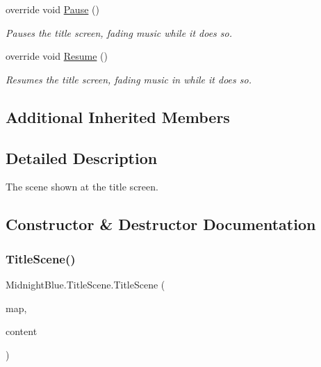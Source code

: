 \begin{DoxyCompactItemize}
override void \hyperlink{class_midnight_blue_1_1_title_scene_a046934bfa3290d443b58bcc1de0919db}{Pause} ()
\begin{DoxyCompactList}\small\item\em Pauses the title screen, fading music while it does so. \end{DoxyCompactList}\item 
override void \hyperlink{class_midnight_blue_1_1_title_scene_afb0bb3ad8b2766b5d57537dc1ef22249}{Resume} ()
\begin{DoxyCompactList}\small\item\em Resumes the title screen, fading music in while it does so. \end{DoxyCompactList}\end{DoxyCompactItemize}
\subsection*{Additional Inherited Members}


\subsection{Detailed Description}
The scene shown at the title screen. 



\subsection{Constructor \& Destructor Documentation}
\hypertarget{class_midnight_blue_1_1_title_scene_a409eb89a58dbec10d5a0002ce78bc9a3}{}\label{class_midnight_blue_1_1_title_scene_a409eb89a58dbec10d5a0002ce78bc9a3} 
\subsubsection{\texorpdfstring{Title\+Scene()}{TitleScene()}}
{\footnotesize\ttfamily Midnight\+Blue.\+Title\+Scene.\+Title\+Scene (\begin{DoxyParamCaption}\item[{\hyperlink{class_m_b2_d_1_1_entity_component_1_1_entity_map}{Entity\+Map}}]{map,  }\item[{Content\+Manager}]{content }\end{DoxyParamCaption})\hspace{0.3cm}{\ttfamily [inline]}}



